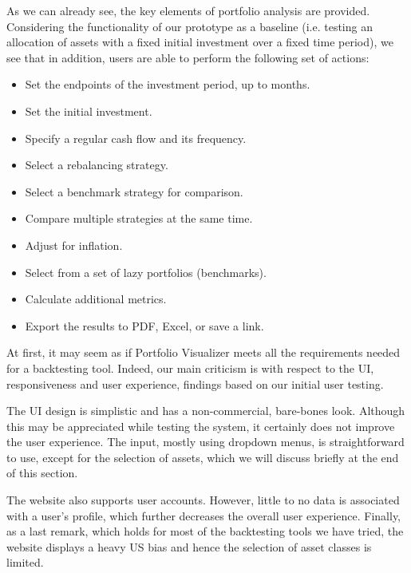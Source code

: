 \documentclass[main.tex]{subfiles}
\begin{document}
As we can already see, the key elements of portfolio analysis are provided. Considering the functionality of our prototype as a baseline (i.e. testing an allocation of assets with a fixed initial investment over a fixed time period), we see that in addition, users are able to perform the following set of actions:

\begin{itemize}
  \item Set the endpoints of the investment period, up to months.
  \item Set the initial investment. 
  \item Specify a regular cash flow and its frequency.
  \item Select a rebalancing strategy.
  \item Select a benchmark strategy for comparison.
  \item Compare multiple strategies at the same time.
  \item Adjust for inflation.
  \item Select from a set of lazy portfolios (benchmarks).
  \item Calculate additional metrics.
  \item Export the results to PDF, Excel, or save a link. 
\end{itemize}

At first, it may seem as if Portfolio Visualizer meets all the requirements needed for a backtesting tool. Indeed, our main criticism is with respect to the UI, responsiveness and user experience, findings based on our initial user testing. 

The UI design is simplistic and has a non-commercial, bare-bones look. Although this may be appreciated while testing the system, it certainly does not improve the user experience. The input, mostly using dropdown menus, is straightforward to use, except for the selection of assets, which we will discuss briefly at the end of this section.


The website also supports user accounts. However, little to no data is associated with a user's profile, which further decreases the overall user experience. Finally, as a last remark, which holds for most of the backtesting tools we have tried, the website displays a heavy US bias and hence the selection of asset classes is limited.
\end{document}
